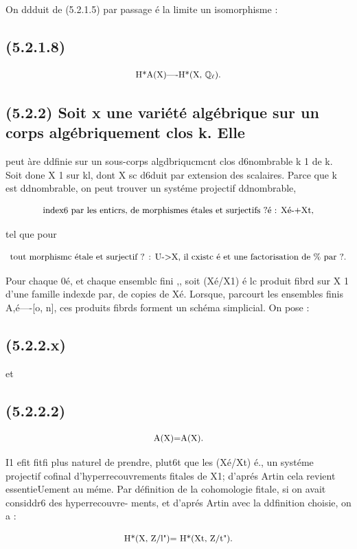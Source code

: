 \documentclass[11pt]{article}
\theoremstyle{remark}
\begin{document}
On ddduit de (5.2.1.5) par passage é la limite un isomorphisme :

\subsection*{(5.2.1.8)}

\[\text{\small H*A(X)----H*(X, \(\mathbb{Q}_{\ell}\)).}\]

\subsection*{(5.2.2) Soit x une variété algébrique sur un corps algébriquement clos k. Elle}

peut àre ddfinie sur un sous-corps algdbriqucmcnt clos d6nombrable k 1 de k. Soit done X 1 sur kl, dont X sc d6duit par extension des scalaires. Parce que k est ddnombrable, on peut trouver un systéme projectif ddnombrable,

\[\text{\small index6 par les enticrs, de morphismes étales et surjectifs ?é : Xé-+Xt,}\]

tel que pour

\[\text{\small tout morphismc étale et surjectif ? : U->X, il cxistc é et une factorisation de \% par ?.}\]

Pour chaque 0é, et chaque ensemblc fini ,, soit (Xé/X1) é lc produit fibrd sur X 1 d'une famille indexde par, de copies de Xé. Lorsque, parcourt les ensembles finis A,é----[o, n], ces produits fibrds forment un schéma simplicial. On pose :

\subsection*{(5.2.2.x)}

et

\subsection*{(5.2.2.2)}

\[\text{\small A(X)=A(X).}\]

I1 efit fitfi plus naturel de prendre, plut6t que les (Xé/Xt) é., un systéme projectif cofinal d'hyperrecouvrements fitales de X1; d'aprés Artin cela revient essentieUement au méme. Par définition de la cohomologie fitale, si on avait considdr6 des hyperrecouvre- ments, et d'aprés Artin avec la ddfinition choisie, on a :

\[\text{\small H*(X, Z/l")= H*(Xt, Z/t").}\]
\end{document}
